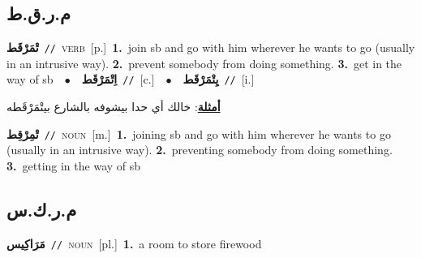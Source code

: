 \documentclass[10pt,a4paper,twoside]{article} %
\begin{document}
\begin{multicols}{2}
\vspace{-3mm}
\subsection*{\color{blue}\foreignlanguage{arabic}{م.ر.ق.ط}\color{blue}{}} 

{\setlength\topsep{0pt}\textbf{\foreignlanguage{arabic}{تْمَرْقَط}}\ {\color{gray}\texttt{//}\color{black}}\ \textsc{verb}\ [p.]\ \textbf{1.}~join sb and go with him wherever he wants to go (usually in an intrusive way).  \textbf{2.}~prevent somebody from doing something.  \textbf{3.}~get in the way of sb\ \ $\bullet$\ \ \setlength\topsep{0pt}\textbf{\foreignlanguage{arabic}{اِتْمَرْقَط}}\ {\color{gray}\texttt{//}\color{black}}\ [c.]\ \ $\bullet$\ \ \setlength\topsep{0pt}\textbf{\foreignlanguage{arabic}{يِتْمَرْقَط}}\ {\color{gray}\texttt{//}\color{black}}\ [i.]\  \begin{flushright}\color{gray}\foreignlanguage{arabic}{\textbf{\underline{\foreignlanguage{arabic}{أمثلة}}}: خالك أي حدا بيشوفه بالشارع بيتْمَرْقَطه}\end{flushright}\color{black}} \vspace{2mm}

{\setlength\topsep{0pt}\textbf{\foreignlanguage{arabic}{تْمِرْقِط}}\ {\color{gray}\texttt{//}\color{black}}\ \textsc{noun}\ [m.]\ \textbf{1.}~joining sb and go with him wherever he wants to go (usually in an intrusive way).  \textbf{2.}~preventing somebody from doing something.  \textbf{3.}~getting in the way of sb\ } \vspace{2mm}

\vspace{-3mm}
\subsection*{\color{blue}\foreignlanguage{arabic}{م.ر.ك.س}\color{blue}{}} 

{\setlength\topsep{0pt}\textbf{\foreignlanguage{arabic}{مَرَاكِيس}}\ {\color{gray}\texttt{//}\color{black}}\ \textsc{noun}\ [pl.]\ \textbf{1.}~a room to store firewood\ } \vspace{2mm}


\end{multicols}
\end{document}
